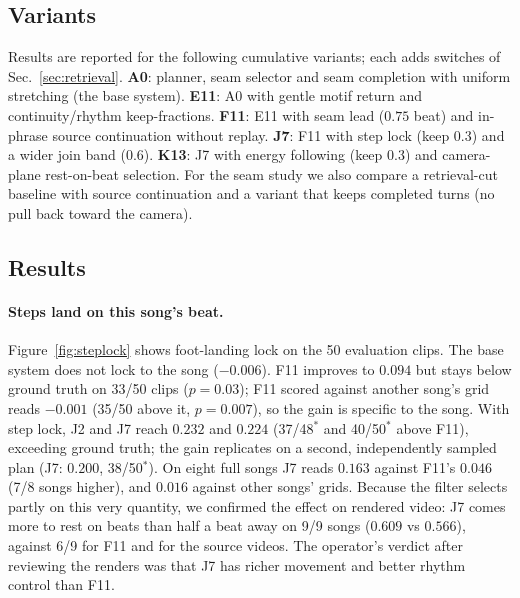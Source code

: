 \documentclass[10pt]{article}
\newcommand{\pairs}[2]{#1/#2}
\begin{document}
\subsection{Variants}
Results are reported for the following cumulative variants; each adds switches of Sec.~\ref{sec:retrieval}.
\textbf{A0}: planner, seam selector and seam completion with uniform stretching (the base system).
\textbf{E11}: A0 with gentle motif return and continuity/rhythm keep-fractions.
\textbf{F11}: E11 with seam lead ($0.75$ beat) and in-phrase source continuation without replay.
\textbf{J7}: F11 with step lock (keep 0.3) and a wider join band (0.6).
\textbf{K13}: J7 with energy following (keep 0.3) and camera-plane rest-on-beat selection.
For the seam study we also compare a retrieval-cut baseline with source continuation and a variant that keeps completed turns (no pull back toward the camera).

\subsection{Results}
\label{sec:results}

\paragraph{Steps land on this song's beat.}
Figure~\ref{fig:steplock} shows foot-landing lock on the 50 evaluation clips.
The base system does not lock to the song ($-0.006$).
F11 improves to $0.094$ but stays below ground truth on \pairs{33}{50} clips ($p{=}0.03$); F11 scored against another song's grid reads $-0.001$ (\pairs{35}{50} above it, $p{=}0.007$), so the gain is specific to the song.
With step lock, J2 and J7 reach $0.232$ and $0.224$ (\pairs{37}{48}$^*$ and \pairs{40}{50}$^*$ above F11), exceeding ground truth; the gain replicates on a second, independently sampled plan (J7: $0.200$, \pairs{38}{50}$^*$).
On eight full songs J7 reads $0.163$ against F11's $0.046$ (7/8 songs higher), and $0.016$ against other songs' grids.
Because the filter selects partly on this very quantity, we confirmed the effect on rendered video: J7 comes more to rest on beats than half a beat away on 9/9 songs ($0.609$ vs $0.566$), against 6/9 for F11 and for the source videos.
The operator's verdict after reviewing the renders was that J7 has richer movement and better rhythm control than F11.
\end{document}
